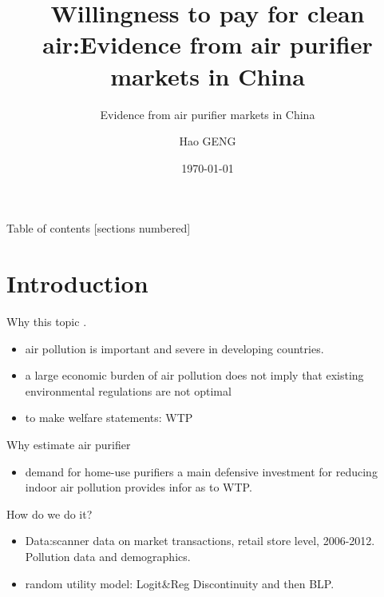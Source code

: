 \documentclass[10pt]{beamer}
\title{Willingness to pay for clean air:Evidence from air purifier markets in China}
\subtitle{Evidence from air purifier markets in China}
\date{\today}
\author{Hao GENG}
\institute{Department of Economics,CUHK}
\begin{document}
\maketitle

\begin{frame}{Table of contents}
  [sections numbered]
  \tableofcontents[hideallsubsections]
\end{frame}

\section{Introduction}

\begin{frame}[fragile]{Why this topic}
.   \begin{itemize}
    \item air pollution is important and severe in developing countries.
    \item a large economic burden of air pollution does not imply that existing environmental regulations are not optimal
    \item to make welfare statements: WTP
\end{itemize}
\end{frame}
\begin{frame}[fragile]{Why estimate air purifier}
    \begin{itemize}
        \item demand for home-use purifiers a main defensive investment for reducing indoor air pollution provides infor as to WTP.
    \end{itemize}
\end{frame}
\begin{frame}{How do we do it?}
    \begin{itemize}
        \item Data:scanner data on market transactions, retail store level, 2006-2012. Pollution data and demographics.
        \item random utility model: Logit&Reg Discontinuity and then BLP.
    \end{itemize}
    
\end{frame}
\end{document}

